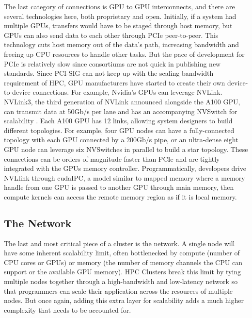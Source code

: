 The last category of connections is \gls{GPU} to \gls{GPU} interconnects, and there are several technologies here, both proprietary and open.
Initially, if a system had multiple \gls{GPU}s, transfers would have to be staged through host memory, but \gls{GPU}s can also send data to each other through \gls{PCIe} peer-to-peer.
This technology cuts host memory out of the data's path, increasing bandwidth and freeing up \gls{CPU} resources to handle other tasks.
But the pace of development for \gls{PCIe} is relatively slow since consortiums are not quick in publishing new standards. 
Since PCI-SIG can not keep up with the scaling bandwidth requirement of \gls{HPC}, \gls{GPU} manufacturers have started to create their own device-to-device connections.
For example, Nvidia's \gls{GPU}s can leverage NVLink.
NVLink3, the third generation of NVLink announced alongside the A100 \gls{GPU}, can transmit data at 50Gb/s per lane and has an accompanying NVSwitch for scalability \cite{Foley2017PascaleAndNVLink}.
Each A100 \gls{GPU} has 12 links, allowing system designers to build different topologies.
For example, four \gls{GPU} nodes can have a fully-connected topology with each \gls{GPU} connected by a 200Gb/s pipe, or an ultra-dense eight \gls{GPU} node can leverage six NVSwitches in parallel to build a star topology.
These connections can be orders of magnitude faster than \gls{PCIe} and are tightly integrated with the \gls{GPU}s memory controller.
Programmatically, developers drive NVLlink through cudaIPC, a model similar to mapped memory where a memory handle from one \gls{GPU} is passed to another \gls{GPU} through main memory, then compute kernels can access the remote memory region as if it is local memory.

\subsection{The Network}
The last and most critical piece of a cluster is the network.  
A single node will have some inherent scalability limit, often bottlenecked by compute (number of \gls{CPU} cores or \gls{GPU}s) or memory (the number of memory channels the \gls{CPU} can support or the available \gls{GPU} memory).
\gls{HPC} Clusters break this limit by tying multiple nodes together through a high-bandwidth and low-latency network so that programmers can scale their application across the resources of multiple nodes.
But once again, adding this extra layer for scalability adds a much higher complexity that needs to be accounted for.

